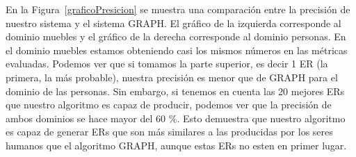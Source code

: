 
\hline
En la Figura~\ref{graficoPresicion} se muestra una comparaci\'on entre la precisi\'on de nuestro sistema y el sistema GRAPH. El gr\'afico de la izquierda corresponde al dominio muebles y el gr\'afico de la derecha corresponde al dominio personas. En el dominio muebles estamos obteniendo casi los mismos n\'umeros en las m\'etricas evaluadas.
Podemos ver que si tomamos la parte superior, es decir 1 ER (la primera, la m\'as probable), nuestra precisi\'on es menor que de GRAPH para el dominio de las personas. Sin embargo, si tenemos en cuenta las 20 mejores ERs que nuestro algoritmo es capaz de producir, podemos ver que la precisi\'on de ambos dominios se hace mayor del 60 \%. Esto demuestra que nuestro algoritmo es capaz de generar ERs que son m\'as similares a las producidas por los seres humanos que el algoritmo GRAPH, aunque estas ERs no esten en primer lugar.

